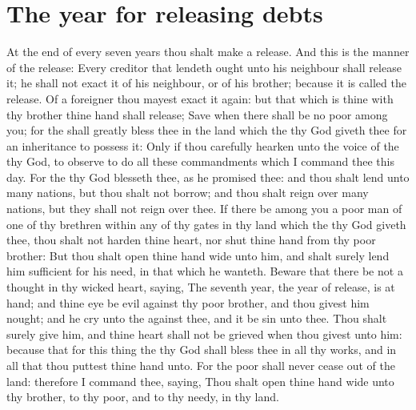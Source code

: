 \section*{The year for releasing debts}
\begin{biblechapter} %
\verse At the end of every seven years thou shalt make a release.
\verse And this is the manner of the release: Every creditor that lendeth ought unto his neighbour shall release it; he shall not exact it of his neighbour, or of his brother; because it is called the \LORDs release.
\verse Of a foreigner thou mayest exact it again: but that which is thine with thy brother thine hand shall release;
\verse Save when there shall be no poor among you; for the \LORD shall greatly bless thee in the land which the \LORD thy God giveth thee for an inheritance to possess it:
\verse Only if thou carefully hearken unto the voice of the \LORD thy God, to observe to do all these commandments which I command thee this day.
\verse For the \LORD thy God blesseth thee, as he promised thee: and thou shalt lend unto many nations, but thou shalt not borrow; and thou shalt reign over many nations, but they shall not reign over thee.
\verse If there be among you a poor man of one of thy brethren within any of thy gates in thy land which the \LORD thy God giveth thee, thou shalt not harden thine heart, nor shut thine hand from thy poor brother:
\verse But thou shalt open thine hand wide unto him, and shalt surely lend him sufficient for his need, in that which he wanteth.
\verse Beware that there be not a thought in thy wicked heart, saying, The seventh year, the year of release, is at hand; and thine eye be evil against thy poor brother, and thou givest him nought; and he cry unto the \LORD against thee, and it be sin unto thee.
\verse Thou shalt surely give him, and thine heart shall not be grieved when thou givest unto him: because that for this thing the \LORD thy God shall bless thee in all thy works, and in all that thou puttest thine hand unto.
\verse For the poor shall never cease out of the land: therefore I command thee, saying, Thou shalt open thine hand wide unto thy brother, to thy poor, and to thy needy, in thy land.

\end{biblechapter}
